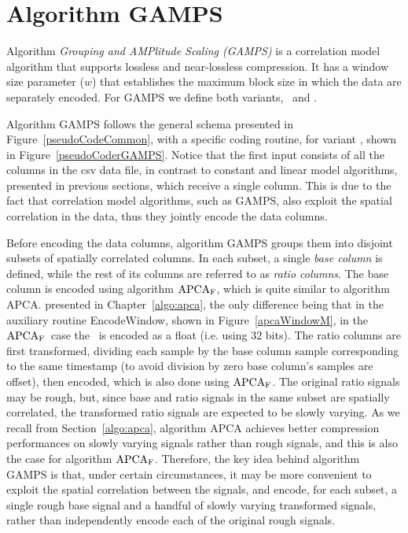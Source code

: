 
\clearpage

\section{Algorithm GAMPS}
\label{algo:gamps}
\newcommand{\apcaF}{$\textnormal{APCA}_\textnormal{F}$}


\vspace{-5pt}
Algorithm \textit{Grouping and AMPlitude Scaling (GAMPS)} \cite{coder:gamps} is a correlation model algorithm that supports lossless and near-lossless compression. It has a window size parameter ($w$) that establishes the maximum block size in which the data are separately encoded. For GAMPS we define both variants, \maskalgo\ and \NOmaskalgo.


Algorithm GAMPS follows the general schema presented in Figure~\ref{pseudoCodeCommon}, with a specific coding routine, for variant \maskalgo, shown in Figure~\ref{pseudoCoderGAMPS}. Notice that the first input consists of all the columns in the csv data file, in contrast to constant and linear model algorithms, presented in previous sections, which receive a single column. This is due to the fact that correlation model algorithms, such as GAMPS, also exploit the spatial correlation in the data, thus they jointly encode the data columns. 


Before encoding the data columns, algorithm GAMPS groups them into disjoint subsets of spatially correlated columns. In each subset, a single \textit{base column} is defined, while the rest of its columns are referred to as \textit{ratio columns}. The base column is encoded using algorithm \apcaF, which is quite similar to algorithm APCA. presented in Chapter~\ref{algo:apca}, the only difference being that in the auxiliary routine EncodeWindow, shown in Figure~\ref{apcaWindowM}, in the \apcaF\ case the \midrange\ is encoded as a float (i.e. using 32 bits). The ratio columns are first transformed, dividing each sample by the base column sample corresponding to the same timestamp (to avoid division by zero base column's samples are offset), then encoded, which is also done using \apcaF. The original ratio signals may be rough, but, since base and ratio signals in the same subset are spatially correlated, the transformed ratio signals are expected to be slowly varying. As we recall from Section~\ref{algo:apca}, algorithm APCA achieves better compression performances on slowly varying signals rather than rough signals, and this is also the case for algorithm \apcaF. Therefore, the key idea behind algorithm GAMPS is that, under certain circumstances, it may be more convenient to exploit the spatial correlation between the signals, and encode, for each subset, a single rough base signal and a handful of slowly varying transformed signals, rather than independently encode each of the original rough signals.


